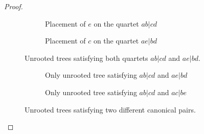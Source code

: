 \documentclass[10pt,a4paper]{article}
\begin{document}
\begin{appendices}
\begin{proof}
\begin{itemize}
\begin{itemize}

\begin{figure}[h]
    \centering
    \begin{subfigure}{0.45\textwidth}
        \centering
        \caption{Placement of $e$ on the quartet $ab|cd$}
        \label{fig:app_place_e_on_ab|cd}
    \end{subfigure}
    \hfill 
    \begin{subfigure}{0.45\textwidth}
        \centering
        \caption{Placement of $c$ on the quartet $ae|bd$}
        \label{fig:app_place_c_on_ae|bd}
    \end{subfigure}
    \caption{Unrooted trees satisfying both quartets $ab|cd$ and $ae|bd$.}
    \label{fig:app_comparison_e_and_c}
\end{figure}

\begin{figure}[h]
    \centering
    \begin{subfigure}{0.45\textwidth}
        \centering
        \caption{Only unrooted tree satisfying $ab|cd$ and $ae|bd$}
        \label{fig:app_unrooted_tree_1}
    \end{subfigure}
    \hfill 
    \centering
    \begin{subfigure}{0.45\textwidth}
        \centering
        \caption{Only unrooted tree satisfying $ab|cd$ and $ac|be$}
        \label{fig:app_unrooted_tree_2}
    \end{subfigure}
    \caption{Unrooted trees satisfying two different canonical pairs.}
    
\end{figure}




\end{itemize}
\end{itemize}
\end{proof}
\end{appendices}
\end{document}
